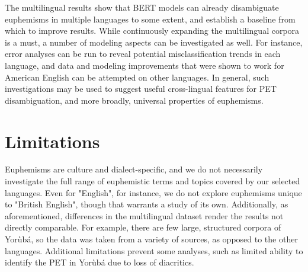\documentclass[11pt]{article}
\begin{document}
The multilingual results show that BERT models can already disambiguate euphemisms in multiple languages to some extent, and establish a baseline from which to improve results. While continuously expanding the multilingual corpora is a must, a number of modeling aspects can be investigated as well. For instance, error analyses can be run to reveal potential misclassification trends in each language, and data and modeling improvements that were shown to work for American English can be attempted on other languages. In general, such investigations may be used to suggest useful cross-lingual features for PET disambiguation, and more broadly, universal properties of euphemisms.

\section*{Limitations}
Euphemisms are culture and dialect-specific, and we do not necessarily investigate the full range of euphemistic terms and topics covered by our selected languages. Even for "English", for instance, we do not explore euphemisms unique to "British English", though that warrants a study of its own. Additionally, as aforementioned, differences in the multilingual dataset render the results not directly comparable. For example, there are few large, structured corpora of {Yor\`{u}b\'{a}}, so the data was taken from a variety of sources, as opposed to the other languages. Additional limitations prevent some analyses, such as limited ability to identify the PET in {Yor\`{u}b\'{a}} due to loss of diacritics.


\end{document}
